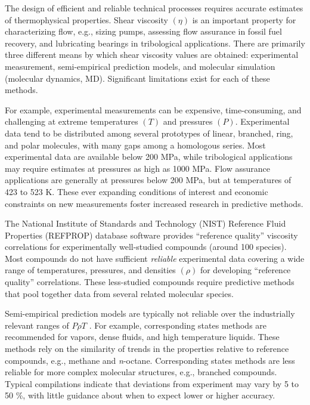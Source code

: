 \documentclass[preprint,review,12pt]{elsarticle}
\begin{document}
	The design of efficient and reliable technical processes requires accurate estimates of thermophysical properties. Shear viscosity $(\eta)$ is an important property for characterizing flow, e.g., sizing pumps, assessing flow assurance in fossil fuel recovery, and lubricating bearings in tribological applications. There are primarily three different means by which shear viscosity values are obtained: experimental measurement, semi-empirical prediction models, and molecular simulation (molecular dynamics, MD). Significant limitations exist for each of these methods. 
	
	For example, experimental measurements can be expensive, time-consuming, and challenging at extreme temperatures $(T)$ and pressures $(P)$. Experimental data tend to be distributed among several prototypes of linear, branched, ring, and polar molecules, with many gaps among a homologous series. Most experimental data are available below 200 MPa, while tribological applications may require estimates at pressures as high as 1000 MPa. Flow assurance applications are generally at pressures below 200 MPa, but at temperatures of 423 to 523 K. These ever expanding conditions of interest and economic constraints on new measurements foster increased research in predictive methods.
	
	
    
    The National Institute of Standards and Technology (NIST) Reference Fluid Properties (REFPROP) database software provides ``reference quality'' viscosity correlations for experimentally well-studied compounds (around 100 species). Most compounds do not have sufficient \textit{reliable} experimental data covering a wide range of temperatures, pressures, and densities $(\rho)$ for developing ``reference quality'' correlations. These less-studied compounds require predictive methods that pool together data from several related molecular species. 
    
    Semi-empirical prediction models are typically not reliable over the industrially relevant ranges of $P \rho T$ \cite{PGL}. For example, corresponding states methods are recommended for vapors, dense fluids, and high temperature liquids. These methods rely on the similarity of trends in the properties relative to reference compounds, e.g., methane and \textit{n}-octane. Corresponding states methods are less reliable for more complex molecular structures, e.g., branched compounds. Typical compilations indicate that deviations from experiment may vary by 5 to 50 \%, with little guidance about when to expect lower or higher accuracy. 
    
\end{document}
